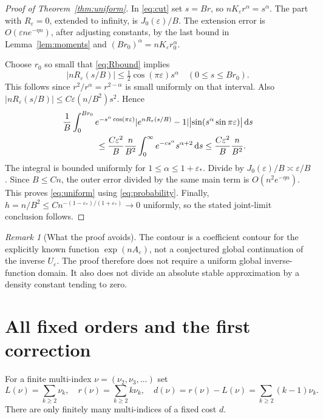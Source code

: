 \documentclass[11pt,a4paper]{article}
\theoremstyle{definition}\newtheorem{definition}[theorem]{Definition}
\theoremstyle{remark}\newtheorem{remark}[theorem]{Remark}
\newcommand{\eps}{\varepsilon}
\newcommand{\1}{\mathbf 1}
\newcommand{\dd}{\,\mathrm d}
\begin{document}
\begin{proof}[Proof of Theorem~\ref{thm:uniform}]
In \eqref{eq:cut} set $s=Br$, so $nK_{\eps}r^{\alpha}=s^{\alpha}$.
The part with $R_{\eps}=0$, extended to infinity, is $J_0(\eps)/B$.
The extension error is $O(\eps n e^{-\eta n})$, after adjusting constants,
by the last bound in Lemma~\ref{lem:moments} and
$(Br_0)^{\alpha}=nK_{\eps}r_0^{\alpha}$.

Choose $r_0$ so small that \eqref{eq:Rbound} implies
\[
 |nR_{\eps}(s/B)|\le\tfrac12\cos(\pi\eps)s^{\alpha}
 \quad(0\le s\le Br_0).
\]
This follows since $r^2/r^{\alpha}=r^{2-\alpha}$ is small uniformly on
that interval. Also
$|nR_{\eps}(s/B)|\le C\eps(n/B^2)s^2$. Hence
\begin{align*}
 &\frac1B\int_0^{Br_0}
 e^{-s^{\alpha}\cos(\pi\eps)}
 |e^{nR_{\eps}(s/B)}-1|
 \bigl|\sin(s^{\alpha}\sin\pi\eps)\bigr|\dd s\\
 &\hspace{14mm}\le
 \frac{C\eps^2}{B}\frac n{B^2}
 \int_0^\infty e^{-c s^{\alpha}}s^{\alpha+2}\dd s
 \le\frac{C\eps^2}{B}\frac n{B^2}.
\end{align*}
The integral is bounded uniformly for $1\le\alpha\le1+\eps_*$. Divide
by $J_0(\eps)/B\asymp\eps/B$. Since $B\le Cn$, the outer error divided
by the same main term is $O(n^2e^{-\eta n})$. This proves
\eqref{eq:uniform} using \eqref{eq:probability}. Finally,
$h=n/B^2\le Cn^{-(1-\eps_*)/(1+\eps_*)}\to0$ uniformly, so the stated
joint-limit conclusion follows.
\end{proof}

\begin{remark}[What the proof avoids]
The contour is a coefficient contour for the explicitly known function
$\exp(nA_{\eps})$, not a conjectured global continuation of the inverse
$U_{\eps}$. The proof therefore does not require a uniform global
inverse-function domain. It also does not divide an absolute stable
approximation by a density constant tending to zero.
\end{remark}

\section{All fixed orders and the first correction}
\label{sec:allorders}

For a finite multi-index $\nu=(\nu_2,\nu_3,\ldots)$ set
\begin{equation}\label{eq:multi}
 L(\nu)=\sum_{k\ge2}\nu_k,\quad
 r(\nu)=\sum_{k\ge2}k\nu_k,\quad
 d(\nu)=r(\nu)-L(\nu)=\sum_{k\ge2}(k-1)\nu_k.
\end{equation}
There are only finitely many multi-indices of a fixed cost $d$.
\end{document}

